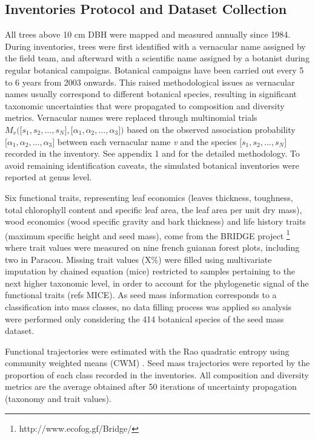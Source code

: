 \documentclass[fleqn,10pt]{ArtEcoFoG} %
\begin{document}
\subsection{Inventories Protocol and Dataset
Collection}\label{inventories-protocol-and-dataset-collection}

All trees above 10 cm DBH were mapped and measured annually since 1984.
During inventories, trees were first identified with a vernacular name
assigned by the field team, and afterward with a scientific name
assigned by a botanist during regular botanical campaigns. Botanical
campaigns have been carried out every 5 to 6 years from 2003 onwards.
This raised methodological issues as vernacular names usually correspond
to different botanical species, resulting in significant taxonomic
uncertainties that were propagated to composition and diversity metrics.
Vernacular names were replaced through multinomial trials
\(M_v\Big(\big[s_1, s_2, …, s_N\big],\big[\alpha_1, \alpha_2,…, \alpha_3\big]\Big)\)
based on the observed association probability
\(\big[\alpha_1, \alpha_2,…, \alpha_3\big]\) between each vernacular
name \emph{v} and the species \(\big[s_1, s_2, …, s_N\big]\) recorded in
the inventory. See appendix 1 and \citet{Aubry-Kientz2013} for the
detailed methodology. To avoid remaining identification caveats, the
simulated botanical inventories were reported at genus level.

Six functional traits, representing leaf economics (leaves thickness,
toughness, total chlorophyll content and specific leaf area, the leaf
area per unit dry mass), wood economics (wood specific gravity and bark
thickness) and life history traits (maximum specific height and seed
mass), come from the BRIDGE project \footnote{http://www.ecofog.gf/Bridge/}
where trait values were measured on nine french guianan forest plots,
including two in Paracou. Missing trait values (X\%) were filled using
multivariate imputation by chained equation (mice) restricted to samples
pertaining to the next higher taxonomic level, in order to account for
the phylogenetic signal of the functional traits (refs MICE). As seed
mass information corresponds to a classification into mass classes, no
data filling process was applied so analysis were performed only
considering the 414 botanical species of the seed mass dataset.

Functional trajectories were estimated with the Rao quadratic entropy
using community weighted means (CWM) \citep{Diaz2007, Garnier2004}. Seed
mass trajectories were reported by the proportion of each class recorded
in the inventories. All composition and diversity metrics are the
average obtained after 50 iterations of uncertainty propagation
(taxonomy and trait values).
\end{document}
